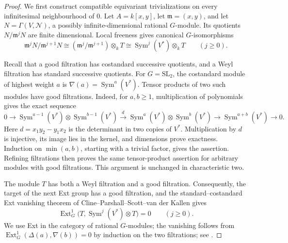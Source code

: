 \begin{proof}
We first construct compatible equivariant trivializations on every
infinitesimal neighbourhood of $0$.  Let $A=k[x,y]$, let
$\mathfrak m=(x,y)$, and let $N=\Gamma(V,\mathcal N)$, a possibly
infinite-dimensional rational $G$-module.  Its quotients
$N/\mathfrak m^jN$ are finite dimensional.  Local freeness gives
canonical $G$-isomorphisms
\begin{equation}
 \label{eq:jet-kernel}
 \mathfrak m^jN/\mathfrak m^{j+1}N
 \cong (\mathfrak m^j/\mathfrak m^{j+1})\otimes_k T
 \cong \operatorname{Sym}^j(V^*)\otimes_k T
 \qquad(j\geq 0).
\end{equation}

Recall that a good filtration has costandard successive quotients, and a
Weyl filtration has standard successive quotients.  For $G=\mathrm{SL}_2$,
the costandard module of highest weight $a$ is
$\nabla(a)=\operatorname{Sym}^a(V^*)$.  Tensor products of two such modules
have good filtrations.  Indeed, for $a,b\geq1$, multiplication of polynomials
gives the exact sequence
\begin{equation}
 \label{eq:symmetric-power-filtration}
 0\longrightarrow
 \operatorname{Sym}^{a-1}(V^*)\otimes\operatorname{Sym}^{b-1}(V^*)
 \xrightarrow{\;d\;}
 \operatorname{Sym}^{a}(V^*)\otimes\operatorname{Sym}^{b}(V^*)
 \longrightarrow \operatorname{Sym}^{a+b}(V^*)
 \longrightarrow0.
\end{equation}
Here $d=x_1y_2-y_1x_2$ is the determinant in two copies of $V^*$.
Multiplication by $d$ is injective, its image lies in the kernel, and
dimensions prove exactness.  Induction on $\min(a,b)$, starting with a
trivial factor, gives the assertion.  Refining filtrations then proves the
same tensor-product assertion for arbitrary modules with good
filtrations.  This argument is unchanged in characteristic two.

The module $T$ has both a Weyl filtration and a good filtration.
Consequently, the target of the next Ext group has a good filtration,
and the standard--costandard Ext vanishing theorem of
Cline--Parshall--Scott--van der Kallen gives
\begin{equation}
 \label{eq:formal-ext-vanishing}
 \operatorname{Ext}^1_G
 \bigl(T,\operatorname{Sym}^j(V^*)\otimes T\bigr)=0
 \qquad(j\geq0).
\end{equation}
We use Ext in the category of rational $G$-modules; the vanishing follows
from $\operatorname{Ext}^1_G(\Delta(a),\nabla(b))=0$ by induction on the two
filtrations; see \cite[Chapter~1, Proposition~2.6, and Chapter~4,
Proposition~1.1]{Riche}.


\end{proof}
